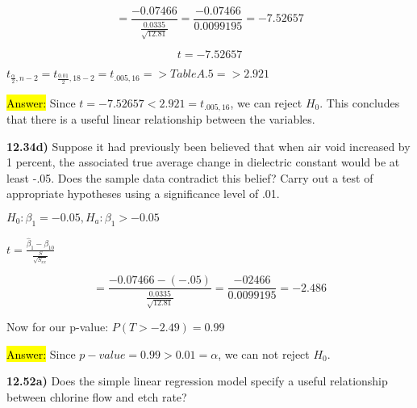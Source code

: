 \documentclass{article}
\begin{document}
\vspace{2mm}

$$=\frac{-0.07466}{\frac{0.0335}{\sqrt{12.81}}}=\frac{-0.07466}{0.0099195}=-7.52657$$


$$t=-7.52657$$

\vspace{2mm}

$t_{\frac{\alpha}{2},n-2}=t_{\frac{0.01}{2}, 18-2}= t_{.005, 16} => Table A.5 => 2.921$

\vspace{2mm}


\hl{Answer:}  Since $t=-7.52657 <  2.921=t_{.005, 16}$, we can reject $H_{0}$.  This concludes that there is a useful linear relationship between the variables. 







\vspace{5mm}


\textbf{12.34d)} Suppose it had previously been believed that when air void increased by 1 percent, the associated true average change in dielectric constant would be at least -.05. Does the sample data contradict this belief? Carry out a test of appropriate hypotheses using a significance level of .01.

\vspace{2mm}


$H_{0}: \beta_{1} = -0.05,  H_{a}:  \beta_{1} > -0.05$

\vspace{2mm}


$t=\frac{\hat{\beta}_{1}-\beta_{10}}{\frac{S}{\sqrt{S_{xx}}}}$

\vspace{2mm}

$$=\frac{-0.07466-(-.05)}{\frac{0.0335}{\sqrt{12.81}}}=\frac{-02466}{0.0099195}=-2.486$$

Now for our p-value: $P(T>-2.49)=0.99$

\vspace{2mm}

\hl{Answer:}  Since $p-value=0.99 > 0.01=\alpha$, we can not reject $H_{0}$. 







\newpage
\textbf{12.52a)} Does the simple linear regression model specify a useful relationship between chlorine flow and etch rate?
\end{document}
